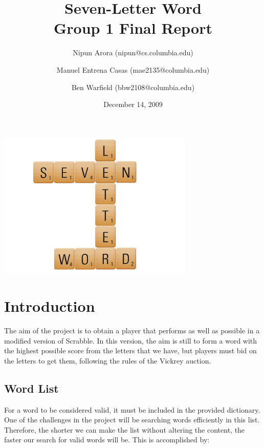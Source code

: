 \documentclass[11pt]{article}
\begin{document}
\title{Seven-Letter Word\\Group 1 Final Report}

\author{
	Nipun Arora (nipun@cs.columbia.edu)
 \and Manuel Entrena Casas (mae2135@columbia.edu)
 \and Ben Warfield (bbw2108@columbia.edu)}

\date{December 14, 2009}
\maketitle
\begin{center}
	\includegraphics[width=0.7\textwidth]{cover}
\end{center}


\newpage
\setcounter{tocdepth}{2}
\tableofcontents
\newpage

\section{ Introduction }

The aim of the project is to obtain a player that performs as well as possible in a modified version of Scrabble. In this version, the aim is still to form a word with the highest possible score from the letters that we have, but players must bid on the letters to get them, following the rules of the Vickrey auction.

\subsection{Word List}

For a word to be considered valid, it must be included in the provided dictionary. One of the challenges in the project will be searching words efficiently in this list. Therefore, the shorter we can make the list without altering the content, the faster our search for valid words will be. This is accomplished by:
\end{document}
